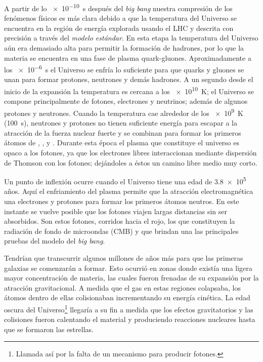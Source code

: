 A partir de lo \SI{e-10}{\second} después del \emph{big bang} nuestra compresión de los fenómenos físicos es más clara debido a que la temperatura del Universo se encuentra en la región de energía explorada usando el LHC y descrita con precisión a través del \emph{modelo estándar}. En esta etapa la temperatura del Universo aún era demasiado alta para permitir la formación de hadrones, por lo que la materia se encuentra en una fase de plasma quark-gluones. Aproximadamente a los \SI{e-6}{\second} el Universo se enfría lo suficiente para que quarks y gluones se unan para formar protones, neutrones y demás hadrones. A un segundo desde el inicio de la expansión la temperatura es cercana a los \SI{e10}{\kelvin}; el Universo se compone principalmente de fotones, electrones y neutrinos; además de algunos protones y neutrones. Cuando la temperatura cae alrededor de los \SI{e9}{\kelvin} (\SI{100}{\second}), neutrones y protones no tienen suficiente energía para escapar a la atracción de la fuerza nuclear fuerte y se combinan para formar los primeros átomos de , ,  y . Durante esta época el plasma que constituye el universo es opaco a los fotones, ya que los electrones libres interaccionan mediante dispersión de Thomson con los fotones; dejándoles a éstos un camino libre medio muy corto.

Un punto de inflexión ocurre cuando el Universo tiene una edad de \num{3.8e5} años. Aquí el enfriamiento del plasma permite que la atracción electromagnética una electrones y protones para formar los primeros átomos neutros. En este instante se vuelve posible que los fotones viajen largas distancias sin ser absorbidos. Son estos fotones, corridos hacia el rojo, los que constituyen la radiación de fondo de microondas (CMB) y que brindan una las principales pruebas del modelo del \emph{big bang}.

Tendrían que transcurrir algunos millones de años más para que las primeras galaxias se comenzarán a formar. Esto ocurrió en zonas donde existía una ligera mayor concentración de materia, las cuales fueron frenadas de su expansión por la atracción gravitacional. A medida que el gas en estas regiones colapsaba, los átomos dentro de ellas colisionaban incrementando su energía cinética. La edad oscura del Universo\footnote{Llamada así por la falta de un mecanismo para producir fotones.} llegaría a su fin a medida que los efectos gravitatorios y las colisiones fueron calentando el material y produciendo reacciones nucleares hasta que se formaron las estrellas.

